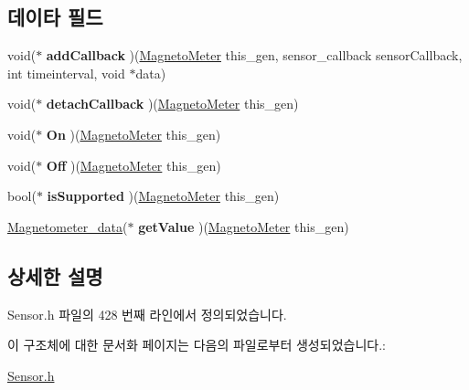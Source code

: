 \subsection*{데이타 필드}
\begin{DoxyCompactItemize}
\item 
\hypertarget{struct__MagnetoMeter_a98cb8c2da6b20d98bfc8098d6685aa1e}{void($\ast$ {\bfseries add\-Callback} )(\hyperlink{struct__MagnetoMeter}{Magneto\-Meter} this\-\_\-gen, sensor\-\_\-callback sensor\-Callback, int timeinterval, void $\ast$data)}\label{struct__MagnetoMeter_a98cb8c2da6b20d98bfc8098d6685aa1e}

\item 
\hypertarget{struct__MagnetoMeter_ad6ef2f08ec21b47db86bf82874a3084f}{void($\ast$ {\bfseries detach\-Callback} )(\hyperlink{struct__MagnetoMeter}{Magneto\-Meter} this\-\_\-gen)}\label{struct__MagnetoMeter_ad6ef2f08ec21b47db86bf82874a3084f}

\item 
\hypertarget{struct__MagnetoMeter_adaae4fb51ff33457e414eb8924c85075}{void($\ast$ {\bfseries On} )(\hyperlink{struct__MagnetoMeter}{Magneto\-Meter} this\-\_\-gen)}\label{struct__MagnetoMeter_adaae4fb51ff33457e414eb8924c85075}

\item 
\hypertarget{struct__MagnetoMeter_ae74e6adbf008d638c954bf852fef4657}{void($\ast$ {\bfseries Off} )(\hyperlink{struct__MagnetoMeter}{Magneto\-Meter} this\-\_\-gen)}\label{struct__MagnetoMeter_ae74e6adbf008d638c954bf852fef4657}

\item 
\hypertarget{struct__MagnetoMeter_aac07cae3561bfd9df065be55fb79f145}{bool($\ast$ {\bfseries is\-Supported} )(\hyperlink{struct__MagnetoMeter}{Magneto\-Meter} this\-\_\-gen)}\label{struct__MagnetoMeter_aac07cae3561bfd9df065be55fb79f145}

\item 
\hypertarget{struct__MagnetoMeter_a481059371d9d2a273df0fabe18e388a0}{\hyperlink{Sensor_8h_df/d29/struct__3d__data}{Magnetometer\-\_\-data}($\ast$ {\bfseries get\-Value} )(\hyperlink{struct__MagnetoMeter}{Magneto\-Meter} this\-\_\-gen)}\label{struct__MagnetoMeter_a481059371d9d2a273df0fabe18e388a0}

\end{DoxyCompactItemize}


\subsection{상세한 설명}


Sensor.\-h 파일의 428 번째 라인에서 정의되었습니다.



이 구조체에 대한 문서화 페이지는 다음의 파일로부터 생성되었습니다.\-:\begin{DoxyCompactItemize}
\item 
\hyperlink{Sensor_8h}{Sensor.\-h}\end{DoxyCompactItemize}
